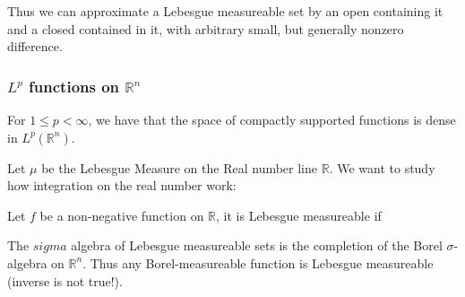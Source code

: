 \documentclass[main.tex]{subfiles}
\begin{document}
Thus we can approximate a Lebesgue measureable set by an open containing it and a closed contained in it, with arbitrary small, but generally nonzero difference.


\subsubsection{$L^p$ functions on $\mathbb{R}^n$}
\begin{theorem}
For $1 \leq p < \infty$, we have that the space of compactly supported functions is dense in $L^p(\mathbb{R}^n)$.
\end{theorem}

Let $\mu$ be the Lebesgue Measure on the Real number line $\mathbb{R}$. We want to study how integration on the real number work:

\begin{definition}
Let $f$ be a non-negative function on $\mathbb{R}$, it is Lebesgue measureable if 
\end{definition}





\begin{remark}
The $sigma$ algebra of Lebesgue measureable sets is the completion of the Borel $\sigma$-algebra on $\mathbb{R}^n$. Thus any Borel-measureable function is Lebesgue measureable (inverse is not true!).
\end{remark}
\end{document}
